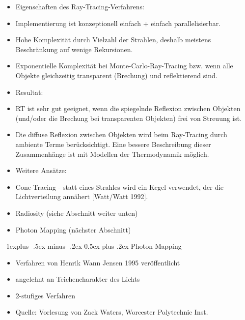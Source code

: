 \documentclass[10pt,landscape]{article}
\makeatletter
\renewcommand{\subsection}{\@startsection{subsection}{2}{0mm}%
                                {-1explus -.5ex minus -.2ex}%
                                {0.5ex plus .2ex}%
                                {\normalfont\normalsize\bfseries}}
\makeatother
\begin{document}
\begin{multicols}{3}
\begin{itemize}
  \item Eigenschaften des Ray-Tracing-Verfahrens:
  \item Implementierung ist konzeptionell einfach + einfach parallelisierbar.
  \item Hohe Komplexität durch Vielzahl der Strahlen, deshalb meistens Beschränkung auf wenige Rekursionen.
  \item Exponentielle Komplexität bei Monte-Carlo-Ray-Tracing bzw. wenn alle Objekte gleichzeitig transparent (Brechung) und reflektierend sind.
  \item Resultat:
  \item RT ist sehr gut geeignet, wenn die spiegelnde Reflexion zwischen Objekten (und/oder die Brechung bei transparenten Objekten) frei von Streuung ist.
  \item Die diffuse Reflexion zwischen Objekten wird beim Ray-Tracing durch ambiente Terme berücksichtigt. Eine bessere Beschreibung dieser Zusammenhänge ist mit Modellen der Thermodynamik möglich.
  \item Weitere Ansätze:
  \item Cone-Tracing - statt eines Strahles wird ein Kegel verwendet, der die Lichtverteilung annähert [Watt/Watt 1992].
  \item Radiosity (siehe Abschnitt weiter unten)
  \item Photon Mapping (nächster Abschnitt)
\end{itemize}

\subsection{ Photon Mapping}
\begin{itemize}
  \item Verfahren von Henrik Wann Jensen 1995 veröffentlicht
  \item angelehnt an Teichencharakter des Lichts
  \item 2-stufiges Verfahren
  \item Quelle: Vorlesung von Zack Waters, Worcester Polytechnic Inst.
\end{itemize}



\end{multicols}
\end{document}
